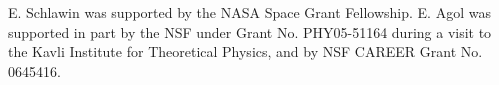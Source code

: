 \documentclass[twocolumn]{emulateapj}
\begin{document}
E. Schlawin was supported by the NASA Space Grant Fellowship. E. Agol was supported in part by the NSF under Grant No.
PHY05-51164 during a visit to the Kavli Institute for
Theoretical Physics, and by NSF CAREER Grant No. 0645416.
\\

  
\end{document}
